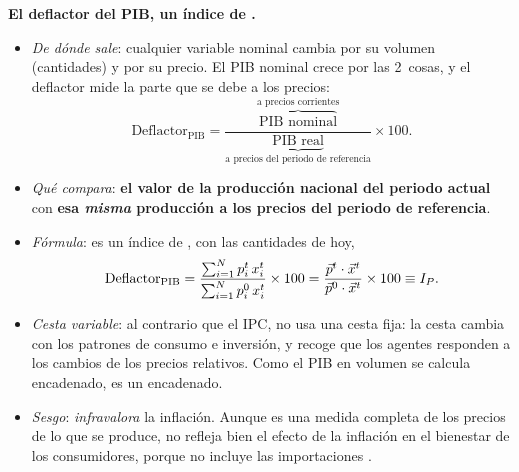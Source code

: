 \documentclass[11pt]{article}
\begin{document}
\begin{anotaciones}
\textbf{El deflactor del PIB, un índice de .}
\begin{itemize}
\item \emph{De dónde sale}: cualquier variable nominal cambia por su volumen (cantidades) y por su precio. El PIB nominal crece por las 2~cosas, y el deflactor mide la parte que se debe a los precios:
\[
\text{Deflactor}_{\mathrm{PIB}}=\frac{\overbrace{\text{PIB nominal}}^{\text{a precios corrientes}}}{\underbrace{\text{PIB real}}_{\text{a precios del periodo de referencia}}}\times100 .
\]
\item \emph{Qué compara}: \textbf{el valor de la producción nacional del periodo actual} con \textbf{esa \emph{misma} producción a los precios del periodo de referencia}.
\item \emph{Fórmula}: es un índice de , con las cantidades de hoy,
\[
\text{Deflactor}_{\mathrm{PIB}}=\frac{\sum_{i=1}^{N}p_i^t\,x_i^t}{\sum_{i=1}^{N}p_i^0\,x_i^t}\times100=\frac{\vec{p}^t\cdot\vec{x}^t}{\vec{p}^0\cdot\vec{x}^t}\times100\equiv I_P .
\]
\item \emph{Cesta variable}: al contrario que el IPC, no usa una cesta fija: la cesta cambia con los patrones de consumo e inversión, y recoge que los agentes responden a los cambios de los precios relativos. Como el PIB en volumen se calcula encadenado, es un  encadenado.
\item \emph{Sesgo}: \emph{infravalora} la inflación. Aunque es una medida completa de los precios de lo que se produce, no refleja bien el efecto de la inflación en el bienestar de los consumidores, porque no incluye las importaciones   .
\end{itemize}
\end{anotaciones}
\end{document}
